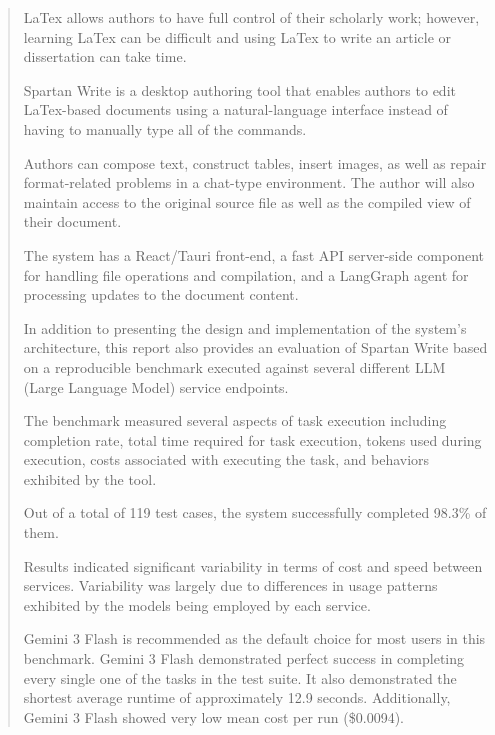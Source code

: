 \begin{abstract}

LaTex allows authors to have full control of their scholarly work; however, learning LaTex can be difficult and using LaTex to write an article or dissertation can take time.

Spartan Write is a desktop authoring tool that enables authors to edit LaTex-based documents using a natural-language interface instead of having to manually type all of the commands.

Authors can compose text, construct tables, insert images, as well as repair format-related problems in a chat-type environment.
The author will also maintain access to the original source file as well as the compiled view of their document.

The system has a React/Tauri front-end, a fast API server-side component for handling file operations and compilation, and a LangGraph agent for processing updates to the document content.

In addition to presenting the design and implementation of the system's architecture, this report also provides an evaluation of Spartan Write based on a reproducible benchmark executed against several different LLM (Large Language Model) service endpoints.

The benchmark measured several aspects of task execution including completion rate, total time required for task execution, tokens used during execution, costs associated with executing the task, and behaviors exhibited by the tool.

Out of a total of 119 test cases, the system successfully completed 98.3\% of them.

Results indicated significant variability in terms of cost and speed between services.
Variability was largely due to differences in usage patterns exhibited by the models being employed by each service.

Gemini 3 Flash is recommended as the default choice for most users in this benchmark.
Gemini 3 Flash demonstrated perfect success in completing every single one of the tasks in the test suite.
It also demonstrated the shortest average runtime of approximately 12.9 seconds.
Additionally, Gemini 3 Flash showed very low mean cost per run (\$0.0094).

\end{abstract}
